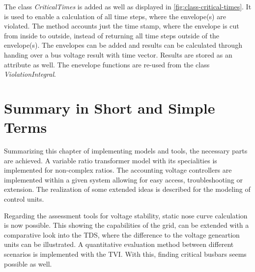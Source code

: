 The class \textit{CriticalTimes} is added as well as displayed in \autoref{fig:class-critical-times}.
It is used to enable a calculation of all time steps, where the envelope(s) are violated.
The method accounts just the time stamp, where the envelope is cut from inside to outside, instead of returning all time steps outside of the envelope(s).
The envelopes can be added and results can be calculated through handing over a bus voltage result with time vector.
Results are stored as an attribute as well.
The enevelope functions are re-used from the class \textit{ViolationIntegral}.

\section{Summary in Short and Simple Terms}

Summarizing this chapter of implementing models and tools, the necessary parts are achieved.
A variable ratio transformer model with its specialities is implemented for non-complex ratios.
The accounting voltage controllers are implemented within a given system allowing for easy access, troubleshooting or extension.
The realization of some extended ideas is described for the modeling of control units.

Regarding the assessment tools for voltage stability, static nose curve calculation is now possible.
This showing the capabilities of the grid, can be extended with a comparative look into the \acs{TDS}, where the difference to the voltage geneartion units can be illustrated.
A quantitative evaluation method between different scenarios is implemented with the \acf{TVI}.
With this, finding critical busbars seems possible as well.